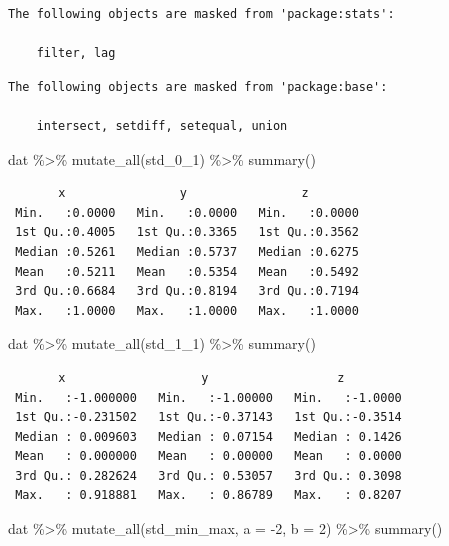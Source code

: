 \documentclass[
  letterpaper,
  DIV=11,
  numbers=noendperiod]{scrreprt}
\newenvironment{Shaded}{\begin{snugshade}}{\end{snugshade}}
\newcommand{\AttributeTok}[1]{\textcolor[rgb]{0.40,0.45,0.13}{#1}}
\newcommand{\DecValTok}[1]{\textcolor[rgb]{0.68,0.00,0.00}{#1}}
\newcommand{\FunctionTok}[1]{\textcolor[rgb]{0.28,0.35,0.67}{#1}}
\newcommand{\NormalTok}[1]{\textcolor[rgb]{0.00,0.23,0.31}{#1}}
\newcommand{\SpecialCharTok}[1]{\textcolor[rgb]{0.37,0.37,0.37}{#1}}
\begin{document}
\begin{verbatim}
The following objects are masked from 'package:stats':

    filter, lag
\end{verbatim}

\begin{verbatim}
The following objects are masked from 'package:base':

    intersect, setdiff, setequal, union
\end{verbatim}

\begin{Shaded}
\begin{Highlighting}[]
\NormalTok{dat }\SpecialCharTok{\%\textgreater{}\%} \FunctionTok{mutate\_all}\NormalTok{(std\_0\_1) }\SpecialCharTok{\%\textgreater{}\%} \FunctionTok{summary}\NormalTok{()}
\end{Highlighting}
\end{Shaded}

\begin{verbatim}
       x                y                z         
 Min.   :0.0000   Min.   :0.0000   Min.   :0.0000  
 1st Qu.:0.4005   1st Qu.:0.3365   1st Qu.:0.3562  
 Median :0.5261   Median :0.5737   Median :0.6275  
 Mean   :0.5211   Mean   :0.5354   Mean   :0.5492  
 3rd Qu.:0.6684   3rd Qu.:0.8194   3rd Qu.:0.7194  
 Max.   :1.0000   Max.   :1.0000   Max.   :1.0000  
\end{verbatim}

\begin{Shaded}
\begin{Highlighting}[]
\NormalTok{dat }\SpecialCharTok{\%\textgreater{}\%} \FunctionTok{mutate\_all}\NormalTok{(std\_1\_1) }\SpecialCharTok{\%\textgreater{}\%} \FunctionTok{summary}\NormalTok{()}
\end{Highlighting}
\end{Shaded}

\begin{verbatim}
       x                   y                  z          
 Min.   :-1.000000   Min.   :-1.00000   Min.   :-1.0000  
 1st Qu.:-0.231502   1st Qu.:-0.37143   1st Qu.:-0.3514  
 Median : 0.009603   Median : 0.07154   Median : 0.1426  
 Mean   : 0.000000   Mean   : 0.00000   Mean   : 0.0000  
 3rd Qu.: 0.282624   3rd Qu.: 0.53057   3rd Qu.: 0.3098  
 Max.   : 0.918881   Max.   : 0.86789   Max.   : 0.8207  
\end{verbatim}

\begin{Shaded}
\begin{Highlighting}[]
\NormalTok{dat }\SpecialCharTok{\%\textgreater{}\%} \FunctionTok{mutate\_all}\NormalTok{(std\_min\_max, }\AttributeTok{a =} \SpecialCharTok{{-}}\DecValTok{2}\NormalTok{, }\AttributeTok{b =} \DecValTok{2}\NormalTok{) }\SpecialCharTok{\%\textgreater{}\%} \FunctionTok{summary}\NormalTok{()}
\end{Highlighting}
\end{Shaded}
\end{document}
